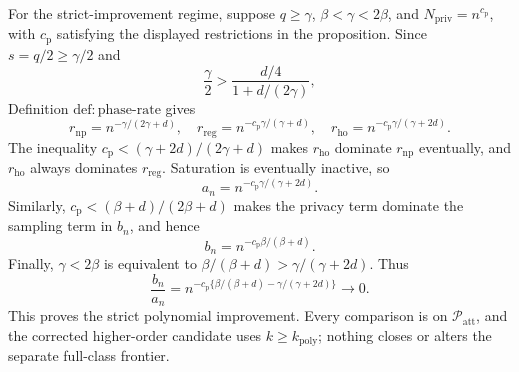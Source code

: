 For the strict-improvement regime, suppose \(q\ge\gamma\), \(\beta<\gamma<2\beta\), and \(N_{\mathrm{priv}}=n^{c_{\mathrm p}}\), with \(c_{\mathrm p}\) satisfying the displayed restrictions in the proposition.  Since \(s=q/2\ge\gamma/2\) and
\[
 \frac{\gamma}{2}>
 \frac{d/4}{1+d/(2\gamma)},
\]
Definition \(\mathrm{def{:}phase\text{-}rate}\) gives
\[
 r_{\mathrm{np}}=n^{-\gamma/(2\gamma+d)},
 \quad r_{\mathrm{reg}}=n^{-c_{\mathrm p}\gamma/(\gamma+d)},
 \quad r_{\mathrm{ho}}=n^{-c_{\mathrm p}\gamma/(\gamma+2d)}.
\tag{16}
\]
The inequality \(c_{\mathrm p}< (\gamma+2d)/(2\gamma+d)\) makes \(r_{\mathrm{ho}}\) dominate \(r_{\mathrm{np}}\) eventually, and \(r_{\mathrm{ho}}\) always dominates \(r_{\mathrm{reg}}\).  Saturation is eventually inactive, so
\[
 a_n=n^{-c_{\mathrm p}\gamma/(\gamma+2d)}.
\tag{17}
\]
Similarly, \(c_{\mathrm p}< (\beta+d)/(2\beta+d)\) makes the privacy term dominate the sampling term in \(b_n\), and hence
\[
 b_n=n^{-c_{\mathrm p}\beta/(\beta+d)}.
\tag{18}
\]
Finally, \(\gamma<2\beta\) is equivalent to \(\beta/(\beta+d)>\gamma/(\gamma+2d)\).  Thus
\[
 \frac{b_n}{a_n}
 =n^{-c_{\mathrm p}\{\beta/(\beta+d)-\gamma/(\gamma+2d)\}}
 \longrightarrow0.
\]
This proves the strict polynomial improvement.  Every comparison is on \(\mathcal P_{\mathrm{att}}\), and the corrected higher-order candidate uses \(k\ge k_{\mathrm{poly}}\); nothing closes or alters the separate full-class frontier.
